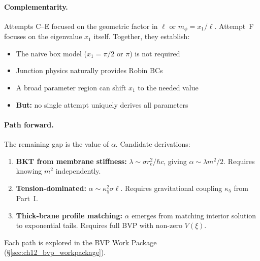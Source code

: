 \paragraph{Complementarity.}
Attempts C--E focused on the geometric factor in $\ell$ or $m_\phi = x_1/\ell$.
Attempt~F focuses on the eigenvalue $x_1$ itself. Together, they establish:
\begin{itemize}[nosep]
    \item The naive box model ($x_1 = \pi/2$ or $\pi$) is not required
    \item Junction physics naturally provides Robin BCs
    \item A broad parameter region can shift $x_1$ to the needed value
    \item \textbf{But:} no single attempt uniquely derives all parameters
\end{itemize}

\paragraph{Path forward.}
The remaining gap is the value of $\alpha$. Candidate derivations:
\begin{enumerate}[nosep]
    \item \textbf{BKT from membrane stiffness:} $\lambda \sim \sigma r_e^2 / \hbar c$, giving
          $\alpha \sim \lambda m^2 / 2$. Requires knowing $m^2$ independently.
    \item \textbf{Tension-dominated:} $\alpha \sim \kappa_5^2 \sigma \ell$. Requires
          gravitational coupling $\kappa_5$ from Part~I.
    \item \textbf{Thick-brane profile matching:} $\alpha$ emerges from matching interior
          solution to exponential tails. Requires full BVP with non-zero $V(\xi)$.
\end{enumerate}
Each path is explored in the BVP Work Package (\S\ref{sec:ch12_bvp_workpackage}).

